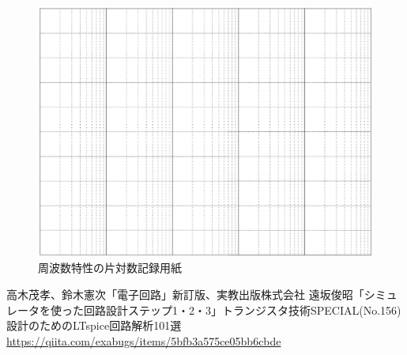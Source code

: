 \documentclass[uplatex,a4paper,11pt,oneside,openany]{jsbook}
\begin{document}
\begin{figure}[H]
	\centering
	\includegraphics[keepaspectratio, scale=0.76, angle=90]
	{figs/eps/logscale.eps}
	\caption{周波数特性の片対数記録用紙}
	\label{fig:xx}
\end{figure}
%
%
\appendix
%
\begin{thebibliography}{99}
 高木茂孝、鈴木憲次「電子回路」新訂版、実教出版株式会社
 遠坂俊昭「シミュレータを使った回路設計ステップ1・2・3」トランジスタ技術SPECIAL(No.156)設計のためのLTspice回路解析101選
 \url{https://qiita.com/exabugs/items/5bfb3a575ce05bb6cbde}
\end{thebibliography}
%
\end{document}
